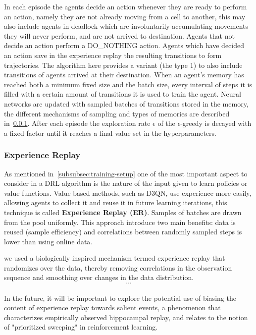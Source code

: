 \documentclass[11pt, a4paper, hidelinks]{report}
\begin{document}
In each episode the agents decide an action whenever they are ready to perform an action, namely they are not already moving from a cell to another, this may also include agents in deadlock which are involuntarily accumulating movements they will never perform, and are not arrived to destination.
Agents that not decide an action perform a DO\_NOTHING action.
Agents which have decided an action save in the experience replay the resulting transitions to form trajectories.
The algorithm here provides a variant (the type 1) to also include transitions of agents arrived at their destination.
When an agent's memory has reached both a minimum fixed size and the batch size, every interval of steps it is filled with a certain amount of transitions it is used to train the agent.
Neural networks are updated with sampled batches of transitions stored in the memory, the different mechanisms of sampling and types of memories are described in~\ref{subsubsec:experience-replay}.
After each episode the exploration rate $\epsilon$ of the $\epsilon$-greedy is decayed with a fixed factor until it reaches a final value set in the hyperparameters.

\subsubsection{Experience Replay}\label{subsubsec:experience-replay}

As mentioned in~\ref{subsubsec:training-setup} one of the most important aspect to consider in a DRL algorithm is the nature of the input given to learn policies or value functions.
Value based methods, such as D3QN, use experience more easily, allowing agents to collect it and reuse it in future learning iterations, this technique is called \textbf{Experience Replay (ER)}.
Samples of batches are drawn from the pool uniformly.
This approach introduce two main benefits: data is reused (sample efficiency) and correlations between randomly sampled steps is lower than using online data.

\begin{quoting}[font=itshape, begintext={"}, endtext={"\citep{human-level}}]
we used a biologically inspired mechanism termed experience replay that randomizes over the data, thereby removing correlations in the observation sequence and smoothing over changes in the data distribution.\\
\[\dots\]\\
In the future, it will be important to explore the potential use of biasing the content of experience replay towards salient events, a phenomenon that characterizes empirically observed hippocampal replay, and relates to the notion of "prioritized sweeping" in reinforcement learning.
\end{quoting}
\end{document}
